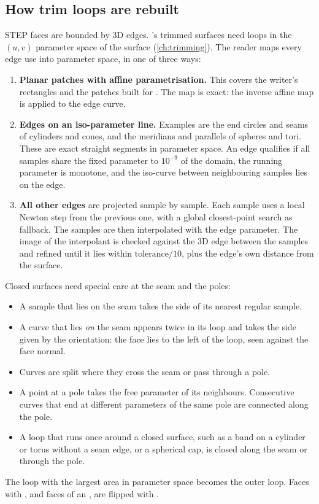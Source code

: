 \subsection{How trim loops are rebuilt}

STEP faces are bounded by 3D edges. \NF{}'s trimmed surfaces need loops in the $(u,v)$
parameter space of the surface (\cref{ch:trimming}). The reader maps every edge use into
parameter space, in one of three ways:

\begin{enumerate}
  \item \textbf{Planar patches with affine parametrisation.} This covers the writer's
    rectangles and the patches built for . The map is exact: the inverse affine map
    is applied to the edge curve.
  \item \textbf{Edges on an iso-parameter line.} Examples are the end circles and seams of
    cylinders and cones, and the meridians and parallels of spheres and tori. These are exact
    straight segments in parameter space. An edge qualifies if all samples share the fixed
    parameter to $10^{-9}$ of the domain, the running parameter is monotone, and the
    iso-curve between neighbouring samples lies on the edge.
  \item \textbf{All other edges} are projected sample by sample. Each sample uses a local
    Newton step from the previous one, with a global closest-point search as fallback. The
    samples are then interpolated with the edge parameter. The image of the interpolant is
    checked against the 3D edge between the samples and refined until it lies within
    $\text{tolerance}/10$, plus the edge's own distance from the surface.
\end{enumerate}

Closed surfaces need special care at the seam and the poles:
\begin{itemize}
  \item A sample that lies on the seam takes the side of its nearest regular sample.
  \item A curve that lies \emph{on} the seam appears twice in its loop and takes the side given
    by the orientation: the face lies to the left of the loop, seen against the face normal.
  \item Curves are split where they cross the seam or pass through a pole.
  \item A point at a pole takes the free parameter of its neighbours. Consecutive curves that
    end at different parameters of the same pole are connected along the pole.
  \item A loop that runs once around a closed surface, such as a band on a cylinder or torus
    without a seam edge, or a spherical cap, is closed along the seam or through the pole.
\end{itemize}
The loop with the largest area in parameter space becomes the outer loop. Faces with
, and faces of an , are flipped with
.

